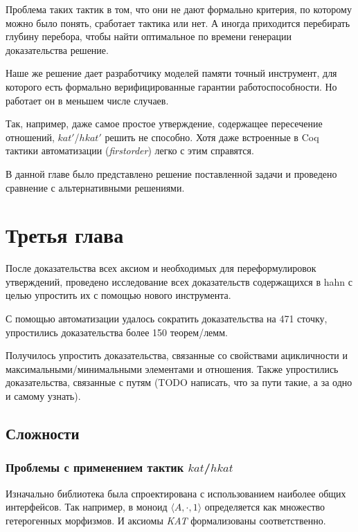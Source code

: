 \documentclass[times
              ]{itmo-student-thesis}
\begin{document}
    Проблема таких тактик в том, что они не дают формально критерия, по которому можно было понять, сработает тактика или нет.
    А иногда приходится перебирать глубину перебора, чтобы найти оптимальное по времени генерации доказательства решение.

    Наше же решение дает разработчику моделей памяти точный инструмент, для которого есть формально верифицированные гарантии работоспособности.
    Но работает он в меньшем числе случаев.

    Так, например, даже самое простое утверждение, содержащее пересечение отношений, $ kat' $/$ hkat' $ решить не способно.
    Хотя даже встроенные в Coq тактики автоматизации (\textit{firstorder}) легко с этим справятся.

  \chapterconclusion %
    В данной главе было представлено решение поставленной задачи и проведено сравнение с альтернативными решениями.

\chapter{Третья глава}

  После доказательства всех аксиом и необходимых для переформулировок утверждений,
  проведено исследование всех доказательств содержащихся в hahn с целью упростить их с помощью нового инструмента.

  С помощью автоматизации удалось сократить доказательства на 471 сточку, упростились доказательства более 150 теорем/лемм.

  Получилось упростить доказательства, связанные со свойствами ацикличности и максимальными/минимальными элементами и отношения.
  Также упростились доказательства, связанные с путям (TODO написать, что за пути такие, а за одно и самому узнать).

  \section{Сложности}
    \subsection{Проблемы с применением тактик $kat$/$hkat$}
      Изначально библиотека была спроектирована с использованием наиболее общих интерфейсов.
      Так например, в моноид $ \langle A, \cdot, 1 \rangle $ определяется как множество гетерогенных морфизмов. И аксиомы \textit{KAT} формализованы соответственно.
\end{document}
